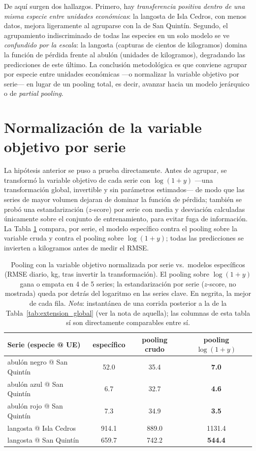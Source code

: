 De aquí surgen dos hallazgos. Primero, hay \emph{transferencia positiva dentro de una misma especie entre unidades económicas}: la langosta de Isla Cedros, con menos datos, mejora ligeramente al agruparse con la de San Quintín. Segundo, el agrupamiento indiscriminado de todas las especies en un solo modelo se ve \emph{confundido por la escala}: la langosta (capturas de cientos de kilogramos) domina la función de pérdida frente al abulón (unidades de kilogramos), degradando las predicciones de este último. La conclusión metodológica es que conviene agrupar por especie entre unidades económicas —o normalizar la variable objetivo por serie— en lugar de un pooling total, es decir, avanzar hacia un modelo jerárquico o de \emph{partial pooling}.

\section{Normalización de la variable objetivo por serie}
La hipótesis anterior se puso a prueba directamente. Antes de agrupar, se transformó la variable objetivo de cada serie con $\log(1+y)$ —una transformación global, invertible y sin parámetros estimados— de modo que las series de mayor volumen dejaran de dominar la función de pérdida; también se probó una estandarización ($z$-score) por serie con media y desviación calculadas únicamente sobre el conjunto de entrenamiento, para evitar fuga de información. La Tabla \ref{tab:extension_ynorm} compara, por serie, el modelo específico contra el pooling sobre la variable cruda y contra el pooling sobre $\log(1+y)$; todas las predicciones se invierten a kilogramos antes de medir el RMSE.

\begin{table}[htbp]
\centering
\small
\begin{tabular}{lccc}
\toprule
Serie (especie @ UE) & específico & pooling crudo & pooling $\log(1{+}y)$ \\
\midrule
abulón negro @ San Quintín & 52.0 & 35.4 & \textbf{7.0} \\
abulón azul @ San Quintín & 6.7 & 32.7 & \textbf{4.6} \\
abulón rojo @ San Quintín & 7.3 & 34.9 & \textbf{3.5} \\
langosta @ Isla Cedros & 914.1 & 889.0 & 1131.4 \\
langosta @ San Quintín & 659.7 & 742.2 & \textbf{544.4} \\
\bottomrule
\end{tabular}
\caption{Pooling con la variable objetivo normalizada por serie vs.\ modelos específicos (RMSE diario, kg, tras invertir la transformación). El pooling sobre $\log(1+y)$ gana o empata en 4 de 5 series; la estandarización por serie ($z$-score, no mostrada) queda por detrás del logaritmo en las series clave. En negrita, la mejor de cada fila. \emph{Nota}: instantánea de una corrida posterior a la de la Tabla~\ref{tab:extension_global} (ver la nota de aquella); las columnas de esta tabla sí son directamente comparables entre sí.}
\label{tab:extension_ynorm}
\end{table}

